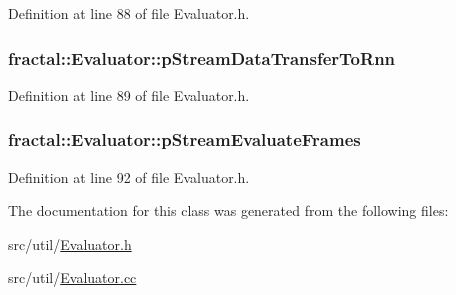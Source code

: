 Definition at line 88 of file Evaluator.\+h.

\hypertarget{classfractal_1_1Evaluator_a4e4c2b409fe2ab8460ebbbb1e41fca90}{
\subsubsection[{p\+Stream\+Data\+Transfer\+To\+Rnn}]{ fractal\+::\+Evaluator\+::p\+Stream\+Data\+Transfer\+To\+Rnn\hspace{0.3cm}{\ttfamily [protected]}}}\label{classfractal_1_1Evaluator_a4e4c2b409fe2ab8460ebbbb1e41fca90}


Definition at line 89 of file Evaluator.\+h.

\hypertarget{classfractal_1_1Evaluator_a1b28c337bbd72ffbef3d74a98954bbee}{
\subsubsection[{p\+Stream\+Evaluate\+Frames}]{ fractal\+::\+Evaluator\+::p\+Stream\+Evaluate\+Frames\hspace{0.3cm}{\ttfamily [protected]}}}\label{classfractal_1_1Evaluator_a1b28c337bbd72ffbef3d74a98954bbee}


Definition at line 92 of file Evaluator.\+h.



The documentation for this class was generated from the following files\+:\begin{DoxyCompactItemize}
\item 
src/util/\hyperlink{Evaluator_8h}{Evaluator.\+h}\item 
src/util/\hyperlink{Evaluator_8cc}{Evaluator.\+cc}\end{DoxyCompactItemize}
